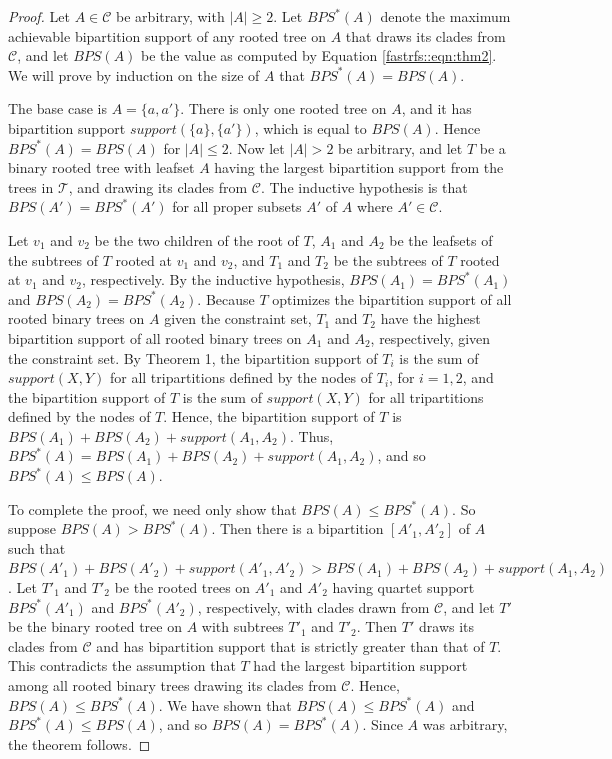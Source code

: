 \begin{proof}
Let $A \in \mathcal{C}$ be arbitrary, with $|A|\geq 2$.
Let $BPS^*(A)$ denote the maximum achievable bipartition support
of any
rooted tree on $A$ that draws its clades from $\mathcal{C}$,
and let $BPS(A)$ be the value as
computed by Equation \ref{fastrfs::eqn:thm2}.
We will prove by induction on the size of $A$ that
$BPS^*(A)=BPS(A)$.

The base case is  $A = \{a,a'\}$. There is
only one rooted tree on 
$A$, and it has
bipartition support
$support(\{a\},\{a'\})$,
which is equal to $BPS(A)$. Hence
$BPS^*(A)=BPS(A)$ for $|A| \leq 2$.
Now let $|A| > 2$ be arbitrary, and let 
$T$ be a binary rooted tree with leafset $A$
having the  largest bipartition support from the 
trees in $\mathcal{T}$, and drawing its clades
from $\mathcal{C}$.
The inductive hypothesis is that $BPS(A')=BPS^*(A')$ for
all proper subsets $A'$ of $A$ where $A' \in \mathcal{C}$.

Let $v_1$ and $v_2$ be the two children of the
root of $T$, $A_1$ and $A_2$ be the
leafsets of the subtrees of $T$ rooted at
$v_1$ and $v_2$, and $T_1$ and $T_2$ be the subtrees of
$T$ rooted at $v_1$ and $v_2$, respectively.
By the inductive hypothesis,
 $BPS(A_1)=BPS^*(A_1)$ and $BPS(A_2)=BPS^*(A_2)$.
Because $T$ optimizes the bipartition support
of all rooted binary trees on $A$
given the constraint set, 
$T_1$ and $T_2$ have the highest bipartition support
of all rooted binary trees on $A_1$ and $A_2$, respectively,
given the constraint set.
By Theorem 1, the bipartition support of
$T_i$ is
the sum of $support(X,Y)$ for all
tripartitions defined by the nodes of $T_i$, for $i=1,2$, and
the bipartition support of $T$  is the sum of $support(X,Y)$
for all tripartitions defined by the nodes of $T$.
Hence, the bipartition support
of $T$ is $BPS(A_1) + BPS(A_2) + support(A_1,A_2)$.
Thus, $BPS^*(A) = BPS(A_1)+BPS(A_2)+support(A_1,A_2)$,
and so $BPS^*(A) \leq BPS(A)$.


To complete the proof, we need only show that $BPS(A) \leq BPS^*(A)$.
So suppose $BPS(A) > BPS^*(A)$. Then
there is a bipartition 
$[A'_1, A'_2]$ of $A$ such that
$BPS(A'_1)+BPS(A'_2)+support(A'_1,A'_2) > BPS(A_1)+BPS(A_2) + support(A_1,A_2)$.
Let $T'_1$ and $T'_2$ be the rooted trees on $A'_1$ and $A'_2$
having quartet support $BPS^*(A'_1)$ and $BPS^*(A'_2)$, respectively, 
with clades drawn from $\mathcal{C}$, 
and let $T'$ be the binary rooted tree on $A$
with subtrees $T'_1$ and $T'_2$.
Then $T'$ draws its clades from $\mathcal{C}$ and
has bipartition support that is strictly greater than
that of $T$. This contradicts the assumption that
$T$ had the largest bipartition support among 
all rooted binary trees drawing its clades from 
$\mathcal{C}$.
Hence, $BPS(A)\leq BPS^*(A)$.
We have shown that $BPS(A) \leq BPS^*(A)$
and $BPS^*(A) \leq BPS(A)$, and so $BPS(A)=BPS^*(A)$.
Since $A$ was arbitrary, the theorem follows.
\end{proof}



